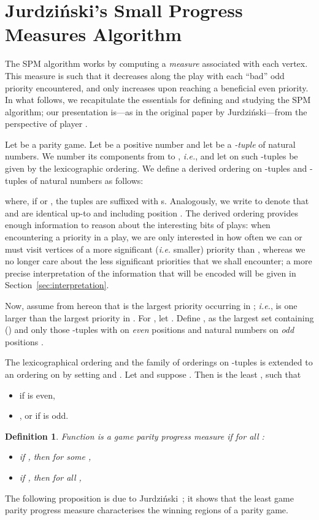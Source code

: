 \documentclass{eptcs}
\newtheorem{defi}{Definition}
\newenvironment{definition}{\begin{defi} \rm }{\end{defi}}
\newcommand{\ie}{\emph{i.e.}\xspace}
\begin{document}
\section{Jurdzi\'nski's Small Progress Measures Algorithm}
\label{sec:spm}

The SPM algorithm works by computing a \emph{measure} associated with
each vertex. This measure is such
that it decreases along the play with each ``bad'' odd priority
encountered, and only increases upon reaching a beneficial even
priority. In what follows, we recapitulate the essentials for defining
and studying the SPM algorithm; our presentation is---as in
the original paper by Jurdzi\'nski---from the perspective of player
. \medskip

Let  be a parity game.
Let  be a positive number and let  be a \emph{-tuple} of natural numbers.  We number
its components from  to , \ie , and let  on such -tuples be given by
the lexicographic ordering. We define a derived ordering  on -tuples and
-tuples of natural numbers as follows:

where, if  or , the tuples are suffixed with s.
Analogously, we write  to denote that  and
 are identical up-to and including position .
The derived ordering provides enough information to
reason about the interesting bits of plays: when encountering a
priority  in a play, we are only interested in how often we can
or must visit vertices of a more significant (\ie smaller) priority
than ,  whereas we no longer care about the less significant priorities that we shall encounter; a more precise interpretation of the information that will be encoded will be given in Section~\ref{sec:interpretation}. 
\medskip

Now, assume from hereon that  is the largest priority occurring in
; \ie,  is one larger than the largest priority
in .  For , let . 
Define , as the largest
set containing 
() and
only those -tuples with  on \emph{even} positions and
natural numbers   on \emph{odd} positions .

The lexicographical ordering  and the family of orderings
 on -tuples is extended to an ordering on 
by setting  and . 
Let  and suppose . Then
 is the least , such that
\begin{itemize}
  \item  if  is even,
  \item , or  if  is odd.
\end{itemize}

\begin{definition} Function
 is a \emph{game parity progress measure}
if for all :
\begin{itemize}
  \item if , then for some , 
  \item if , then for all , 
\end{itemize}
\end{definition}
The following proposition is due to Jurdzi\'nski~\cite{Jur:00}; it shows that
the least game parity progress measure characterises the winning regions of a
parity game.
\end{document}
